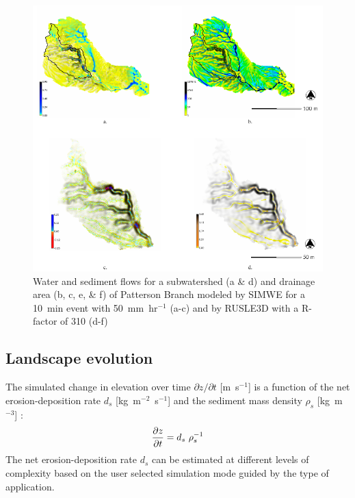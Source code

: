 \documentclass[gmd, manuscript]{copernicus}
\begin{document}
\begin{figure}
\center
\includegraphics[width=\textwidth,height=0.95\textheight,keepaspectratio]{figures/models.pdf}
\caption{Water and sediment flows
for a subwatershed (a \& d) and drainage area (b, c, e, \& f) of Patterson Branch
modeled by SIMWE 
for a 10~\unit{min} event with 50~\unit{mm~hr}$^{-1}$ (a-c)
and by RUSLE3D with a R-factor of 310 (d-f)
}
\label{fig:models}
\end{figure}


\subsection{Landscape evolution}

The simulated change in elevation over time 
${\partial z / \partial t}$ [\unit{m~s}$^{-1}$] is a function of
the net erosion-deposition rate $d_s$ [\unit{kg~m}$^{-2}$~\unit{s}$^{-1}$] 
and the sediment mass density $\rho_s$ [\unit{kg~m}$^{-3}$] 
\citep{Mitasova2013}:
\begin{equation}
\label{eq:evolution} 
{\partial z \over \partial t } = d_s ~ \rho_s^{-1} 
\end{equation}
The net erosion-deposition rate $d_s$ can be estimated at different levels of complexity based 
on the user selected simulation mode guided by the type of application.
\end{document}
